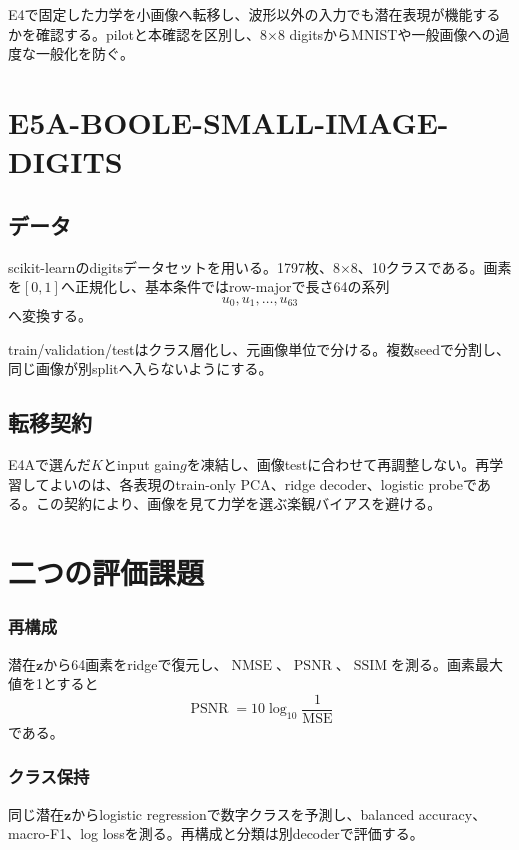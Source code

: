 \documentclass[a4paper,11pt,oneside,openany]{ltjsbook}
\newcommand{\NMSE}{\ensuremath{\operatorname{NMSE}}}
\newcommand{\PSNR}{\ensuremath{\operatorname{PSNR}}}
\newcommand{\SSIM}{\ensuremath{\operatorname{SSIM}}}
\newcommand{\vect}[1]{\bm{#1}}
\begin{document}
\begin{purposebox}
E4で固定した力学を小画像へ転移し、波形以外の入力でも潜在表現が機能するかを確認する。pilotと本確認を区別し、8\(\times\)8 digitsからMNISTや一般画像への過度な一般化を防ぐ。
\end{purposebox}

\section{E5A-BOOLE-SMALL-IMAGE-DIGITS}

\subsection{データ}

scikit-learnのdigitsデータセットを用いる。1797枚、8\(\times\)8、10クラスである。画素を\([0,1]\)へ正規化し、基本条件ではrow-majorで長さ64の系列
\begin{equation}
  u_0,u_1,\dots,u_{63}
  \label{eq:digits_sequence}
\end{equation}
へ変換する。

train/validation/testはクラス層化し、元画像単位で分ける。複数seedで分割し、同じ画像が別splitへ入らないようにする。

\subsection{転移契約}

E4Aで選んだ\(K\)とinput gain\(g\)を凍結し、画像testに合わせて再調整しない。再学習してよいのは、各表現のtrain-only PCA、ridge decoder、logistic probeである。この契約により、画像を見て力学を選ぶ楽観バイアスを避ける。

\section{二つの評価課題}

\subsubsection*{再構成}
潜在\(\vect z\)から64画素をridgeで復元し、\NMSE{}、\PSNR{}、\SSIM{}を測る。画素最大値を1とすると
\begin{equation}
  \PSNR{}
  =10\log_{10}\frac{1}{\mathrm{MSE}}
  \label{eq:psnr}
\end{equation}
である。

\subsubsection*{クラス保持}
同じ潜在\(\vect z\)からlogistic regressionで数字クラスを予測し、balanced accuracy、macro-F1、log lossを測る。再構成と分類は別decoderで評価する。
\end{document}
